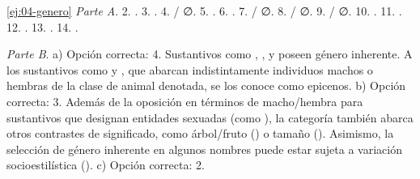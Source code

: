\begin{solucion}{\ref{ej:04-genero}}
\textit{Parte A}. 2. . 3. . 4.  / ∅. 5. . 6.
. 7.  / ∅. 8.  / ∅. 9.  / ∅. 10. . 11.
. 12. . 13. . 14. .

\textit{Parte B}. a) Opción correcta: 4. Sustantivos como ,
,  y  poseen género inherente. A los
sustantivos como  y , que abarcan indistintamente
individuos machos o hembras de la clase de animal denotada, se los conoce como
epicenos. b) Opción correcta: 3. Además de la oposición en términos de
macho/hembra para sustantivos que designan entidades sexuadas (como
), la categoría también abarca otros contrastes de
significado, como árbol/fruto () o tamaño
(). Asimismo, la selección de género
inherente en algunos nombres puede estar sujeta a variación socioestilística
(). c) Opción correcta: 2.
\end{solucion}

